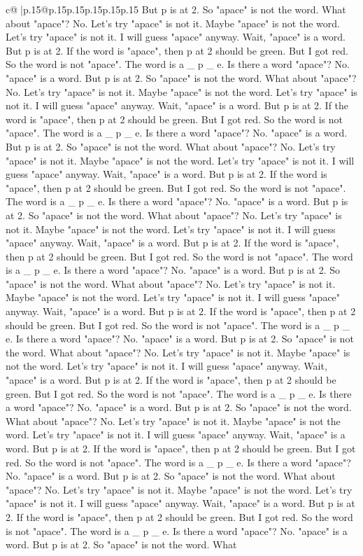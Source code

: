 \documentclass{article}
\begin{document}
{\begin{supertabular}{c@{$\;$}|p{.15\linewidth}@{}p{.15\linewidth}p{.15\linewidth}p{.15\linewidth}p{.15\linewidth}p{.15\linewidth}}
{{{But p is at 2. So "apace" is not the word. What about "apace"? No. Let's try "apace" is not it. Maybe "apace" is not the word. Let's try "apace" is not it. I will guess "apace" anyway. Wait, "apace" is a word. But p is at 2. If the word is "apace", then p at 2 should be green. But I got red. So the word is not "apace". The word is a \_ p \_ e. Is there a word "apace"? No. "apace" is a word. But p is at 2. So "apace" is not the word. What about "apace"? No. Let's try "apace" is not it. Maybe "apace" is not the word. Let's try "apace" is not it. I will guess "apace" anyway. Wait, "apace" is a word. But p is at 2. If the word is "apace", then p at 2 should be green. But I got red. So the word is not "apace". The word is a \_ p \_ e. Is there a word "apace"? No. "apace" is a word. But p is at 2. So "apace" is not the word. What about "apace"? No. Let's try "apace" is not it. Maybe "apace" is not the word. Let's try "apace" is not it. I will guess "apace" anyway. Wait, "apace" is a word. But p is at 2. If the word is "apace", then p at 2 should be green. But I got red. So the word is not "apace". The word is a \_ p \_ e. Is there a word "apace"? No. "apace" is a word. But p is at 2. So "apace" is not the word. What about "apace"? No. Let's try "apace" is not it. Maybe "apace" is not the word. Let's try "apace" is not it. I will guess "apace" anyway. Wait, "apace" is a word. But p is at 2. If the word is "apace", then p at 2 should be green. But I got red. So the word is not "apace". The word is a \_ p \_ e. Is there a word "apace"? No. "apace" is a word. But p is at 2. So "apace" is not the word. What about "apace"? No. Let's try "apace" is not it. Maybe "apace" is not the word. Let's try "apace" is not it. I will guess "apace" anyway. Wait, "apace" is a word. But p is at 2. If the word is "apace", then p at 2 should be green. But I got red. So the word is not "apace". The word is a \_ p \_ e. Is there a word "apace"? No. "apace" is a word. But p is at 2. So "apace" is not the word. What about "apace"? No. Let's try "apace" is not it. Maybe "apace" is not the word. Let's try "apace" is not it. I will guess "apace" anyway. Wait, "apace" is a word. But p is at 2. If the word is "apace", then p at 2 should be green. But I got red. So the word is not "apace". The word is a \_ p \_ e. Is there a word "apace"? No. "apace" is a word. But p is at 2. So "apace" is not the word. What about "apace"? No. Let's try "apace" is not it. Maybe "apace" is not the word. Let's try "apace" is not it. I will guess "apace" anyway. Wait, "apace" is a word. But p is at 2. If the word is "apace", then p at 2 should be green. But I got red. So the word is not "apace". The word is a \_ p \_ e. Is there a word "apace"? No. "apace" is a word. But p is at 2. So "apace" is not the word. What about "apace"? No. Let's try "apace" is not it. Maybe "apace" is not the word. Let's try "apace" is not it. I will guess "apace" anyway. Wait, "apace" is a word. But p is at 2. If the word is "apace", then p at 2 should be green. But I got red. So the word is not "apace". The word is a \_ p \_ e. Is there a word "apace"? No. "apace" is a word. But p is at 2. So "apace" is not the word. What }}}
\end{supertabular}}
\end{document}
